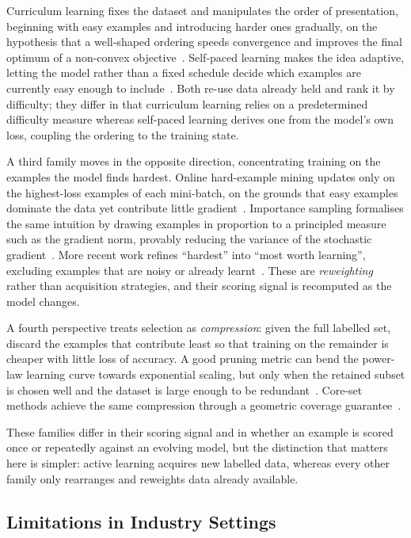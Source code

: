 \documentclass[conference]{IEEEtran}
\begin{document}
Curriculum learning fixes the dataset and manipulates the order of presentation,
beginning with easy examples and introducing harder ones gradually, on the
hypothesis that a well-shaped ordering speeds convergence and improves the final
optimum of a non-convex objective~\cite{bengio2009}. Self-paced learning makes
the idea adaptive, letting the model rather than a fixed schedule decide which
examples are currently easy enough to include~\cite{kumar2010}. Both re-use data
already held and rank it by difficulty; they differ in that curriculum learning
relies on a predetermined difficulty measure whereas self-paced learning derives
one from the model's own loss, coupling the ordering to the training state.

A third family moves in the opposite direction, concentrating training on the
examples the model finds hardest. Online hard-example mining updates only on the
highest-loss examples of each mini-batch, on the grounds that easy examples
dominate the data yet contribute little gradient~\cite{shrivastava2016}.
Importance sampling formalises the same intuition by drawing examples in
proportion to a principled measure such as the gradient norm, provably reducing
the variance of the stochastic gradient~\cite{katharopoulos2018}. More recent
work refines ``hardest'' into ``most worth learning'', excluding examples that
are noisy or already learnt~\cite{mindermann2022}. These are \emph{reweighting}
rather than acquisition strategies, and their scoring signal is recomputed as the
model changes.

A fourth perspective treats selection as \emph{compression}: given the full
labelled set, discard the examples that contribute least so that training on the
remainder is cheaper with little loss of accuracy. A good pruning metric can bend
the power-law learning curve towards exponential scaling, but only when the
retained subset is chosen well and the dataset is large enough to be
redundant~\cite{sorscher2022}. Core-set methods achieve the same compression
through a geometric coverage guarantee~\cite{sener2018}.

These families differ in their scoring signal and in whether an example is scored
once or repeatedly against an evolving model, but the distinction that matters
here is simpler: active learning acquires new labelled data, whereas every other
family only rearranges and reweights data already available.

\subsection{Limitations in Industry Settings}
\label{sec:fixed}
\end{document}
